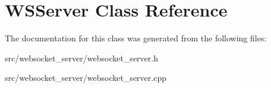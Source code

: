 \hypertarget{classWSServer}{}\section{W\+S\+Server Class Reference}
\label{classWSServer}


The documentation for this class was generated from the following files\+:\begin{DoxyCompactItemize}
\item 
src/websocket\+\_\+server/websocket\+\_\+server.\+h\item 
src/websocket\+\_\+server/websocket\+\_\+server.\+cpp\end{DoxyCompactItemize}

